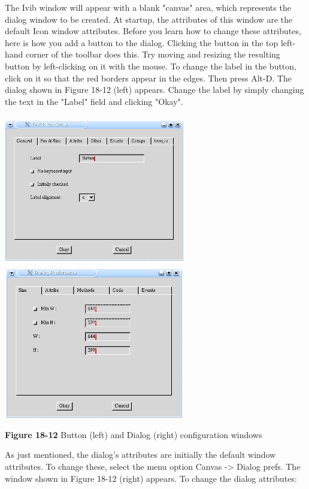 The Ivib window will appear with a blank
"canvas" area, which represents the dialog
window to be created. At startup, the attributes of this window are the
default Icon window attributes. Before you learn how to change these
attributes, here is how you add a button to the dialog. Clicking the
button in the top left-hand corner of the toolbar does this. Try moving
and resizing the resulting button by left-clicking on it with the
mouse. To change the label in the button, click on it so that the red
borders appear in the edges. Then press Alt-D. The dialog shown in
Figure 18-12 (left) appears.
Change the label by simply changing the text in the
"Label" field and clicking "Okay".

\bigskip

\includegraphics[width=3.1in,height=2.6in]{ub-img/ub-img61.jpg}
\includegraphics[width=3.1in,height=2.6in]{ub-img/ub-img63.jpg}

{\sffamily\bfseries Figure 18-12}
{\sffamily Button (left) and Dialog (right) configuration windows}

\bigskip

As just mentioned, the dialog's attributes are
initially the default window attributes. To change these, select the
menu option Canvas -{\textgreater} Dialog prefs. The window shown in
Figure 18-12 (right) appears. To change the dialog attributes:

